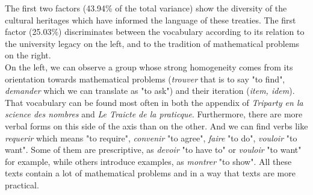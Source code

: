 \documentclass{elsarticle}
\begin{document}
%
%
%
%
%

The first two factors (43.94\% of the total variance) show the diversity of the cultural heritages which have informed the language of these treaties. The first factor (25.03\%) discriminates between the vocabulary according to its relation to the university legacy on the left, and to the tradition of mathematical problems on the right.\\

On the left, we can observe a group whose strong homogeneity comes from its orientation towards mathematical problems (\textit{trouver} that is to say "to find", \textit{demander} which we can translate as "to ask") and their iteration (\textit{item, idem}). That vocabulary can be found most often in both the appendix of \textit{Triparty en la science des nombres} and \textit{Le Traicte de la praticque}. Furthermore, there are more verbal forms on this side of the axis than on the other. And we can find verbs like \textit{requerir} which means "to require", \textit{convenir} "to agree", \textit{faire} "to do", \textit{vouloir} "to want". Some of them are prescriptive, as \textit{devoir} "to have to" or \textit{vouloir} "to want" for example, while others introduce examples, as \textit{montrer} "to show". All these texts contain a lot of mathematical problems and in a way that texts are more practical.\\
\end{document}

